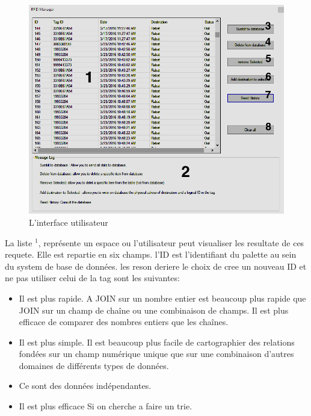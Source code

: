 \documentclass[11pt, a4paper, twoside]{book}
\begin{document}
\begin{figure}[H]
\centering
\includegraphics[width=\textwidth]{software}
\caption{L'interface utilisateur}
\end{figure}
La liste \(^{1}\), représente un espace ou l'utilisateur peut visualiser les resultate de ces requete. Elle est repartie en six champs. l'ID est l'identifiant du palette au sein du system de base de données. les reson deriere le choix de cree un nouveau ID et ne pas utiliser celui de la tag sont les suivantes:
\begin{itemize}
\item Il est plus rapide. A JOIN sur un nombre entier est beaucoup plus rapide que JOIN sur un champ de chaîne ou une combinaison de champs. Il est plus efficace de comparer des nombres entiers que les chaînes.

\item Il est plus simple. Il est beaucoup plus facile de cartographier des relations fondées sur un champ numérique unique que sur une combinaison d'autres domaines de différents types de données.

\item Ce sont des données indépendantes.

\item  Il est plus efficace Si on cherche a faire  un trie.\\
\end{itemize}
\end{document}
